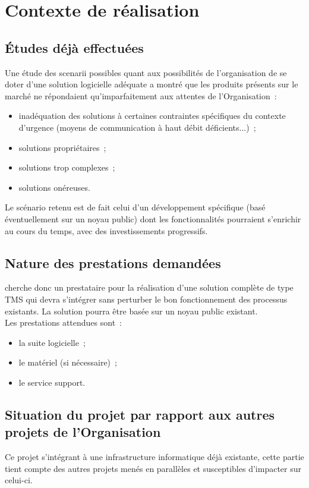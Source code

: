 \section{Contexte de réalisation}

\subsection{Études déjà effectuées}
Une étude des scenarii possibles quant aux possibilités de l'organisation de se doter d'une solution logicielle adéquate a montré que les produits présents sur le marché ne répondaient qu'imparfaitement aux attentes de l'Organisation~:
\begin{itemize}
	\item inadéquation des solutions à certaines contraintes spécifiques du contexte d'urgence (moyens de communication à haut débit déficients...)~;
	\item solutions propriétaires~;
	\item solutions trop complexes~;
	\item solutions onéreuses.
\end{itemize}
Le scénario retenu est de fait celui d'un développement spécifique (basé éventuellement sur un noyau public) dont les fonctionnalités pourraient s'enrichir au cours du temps, avec des investissements progressifs.

\subsection{Nature des prestations demandées}
\mo cherche donc un prestataire pour la réalisation d'une solution complète de type TMS qui devra s'intégrer sans perturber le bon fonctionnement des processus existants. La solution pourra être basée sur un noyau public existant.
\\
Les prestations attendues sont~:
\begin{itemize}
	\item la suite logicielle~;
	\item le matériel (si nécessaire)~;
	\item le service support.
\end{itemize}

\subsection{Situation du projet par rapport aux autres projets de l'Organisation}
Ce projet s'intégrant à une infrastructure informatique déjà existante, cette partie tient compte des autres projets menés en parallèles et susceptibles d'impacter sur celui-ci.

